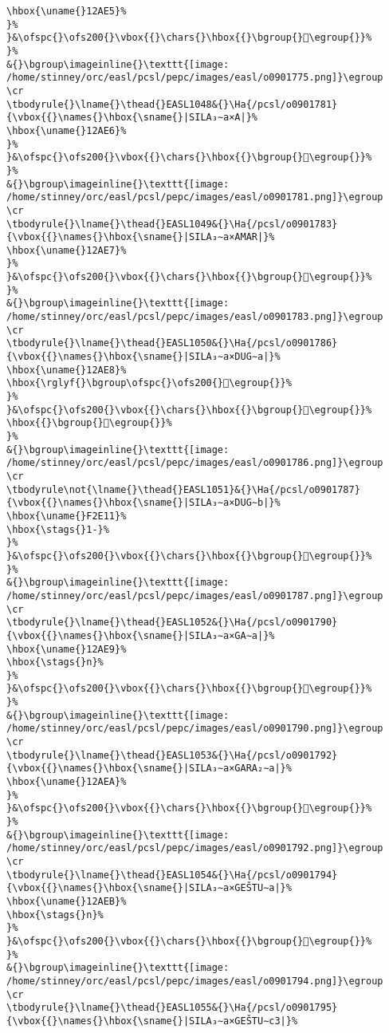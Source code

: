 \begin{verbatim}
\hbox{\uname{}12AE5}%
}%
}&\ofspc{}\ofs200{}\vbox{{}\chars{}\hbox{{}\bgroup{}𒫥\egroup{}}%
}%
&{}\bgroup\imageinline{}\texttt{[image: /home/stinney/orc/easl/pcsl/pepc/images/easl/o0901775.png]}\egroup
\cr
\tbodyrule{}\lname{}\thead{}EASL1048&{}\Ha{/pcsl/o0901781}{\vbox{{}\names{}\hbox{\sname{}|SILA₃∼a×A|}%
\hbox{\uname{}12AE6}%
}%
}&\ofspc{}\ofs200{}\vbox{{}\chars{}\hbox{{}\bgroup{}𒫦\egroup{}}%
}%
&{}\bgroup\imageinline{}\texttt{[image: /home/stinney/orc/easl/pcsl/pepc/images/easl/o0901781.png]}\egroup
\cr
\tbodyrule{}\lname{}\thead{}EASL1049&{}\Ha{/pcsl/o0901783}{\vbox{{}\names{}\hbox{\sname{}|SILA₃∼a×AMAR|}%
\hbox{\uname{}12AE7}%
}%
}&\ofspc{}\ofs200{}\vbox{{}\chars{}\hbox{{}\bgroup{}𒫧\egroup{}}%
}%
&{}\bgroup\imageinline{}\texttt{[image: /home/stinney/orc/easl/pcsl/pepc/images/easl/o0901783.png]}\egroup
\cr
\tbodyrule{}\lname{}\thead{}EASL1050&{}\Ha{/pcsl/o0901786}{\vbox{{}\names{}\hbox{\sname{}|SILA₃∼a×DUG∼a|}%
\hbox{\uname{}12AE8}%
\hbox{\rglyf{}\bgroup\ofspc{}\ofs200{}𒫨\egroup{}}%
}%
}&\ofspc{}\ofs200{}\vbox{{}\chars{}\hbox{{}\bgroup{}𒬉\egroup{}}%
\hbox{{}\bgroup{}𒫨\egroup{}}%
}%
&{}\bgroup\imageinline{}\texttt{[image: /home/stinney/orc/easl/pcsl/pepc/images/easl/o0901786.png]}\egroup
\cr
\tbodyrule\not{\lname{}\thead{}EASL1051}&{}\Ha{/pcsl/o0901787}{\vbox{{}\names{}\hbox{\sname{}|SILA₃∼a×DUG∼b|}%
\hbox{\uname{}F2E11}%
\hbox{\stags{}1-}%
}%
}&\ofspc{}\ofs200{}\vbox{{}\chars{}\hbox{{}\bgroup{}󲸑\egroup{}}%
}%
&{}\bgroup\imageinline{}\texttt{[image: /home/stinney/orc/easl/pcsl/pepc/images/easl/o0901787.png]}\egroup
\cr
\tbodyrule{}\lname{}\thead{}EASL1052&{}\Ha{/pcsl/o0901790}{\vbox{{}\names{}\hbox{\sname{}|SILA₃∼a×GA∼a|}%
\hbox{\uname{}12AE9}%
\hbox{\stags{}n}%
}%
}&\ofspc{}\ofs200{}\vbox{{}\chars{}\hbox{{}\bgroup{}𒫩\egroup{}}%
}%
&{}\bgroup\imageinline{}\texttt{[image: /home/stinney/orc/easl/pcsl/pepc/images/easl/o0901790.png]}\egroup
\cr
\tbodyrule{}\lname{}\thead{}EASL1053&{}\Ha{/pcsl/o0901792}{\vbox{{}\names{}\hbox{\sname{}|SILA₃∼a×GARA₂∼a|}%
\hbox{\uname{}12AEA}%
}%
}&\ofspc{}\ofs200{}\vbox{{}\chars{}\hbox{{}\bgroup{}𒫪\egroup{}}%
}%
&{}\bgroup\imageinline{}\texttt{[image: /home/stinney/orc/easl/pcsl/pepc/images/easl/o0901792.png]}\egroup
\cr
\tbodyrule{}\lname{}\thead{}EASL1054&{}\Ha{/pcsl/o0901794}{\vbox{{}\names{}\hbox{\sname{}|SILA₃∼a×GEŠTU∼a|}%
\hbox{\uname{}12AEB}%
\hbox{\stags{}n}%
}%
}&\ofspc{}\ofs200{}\vbox{{}\chars{}\hbox{{}\bgroup{}𒫫\egroup{}}%
}%
&{}\bgroup\imageinline{}\texttt{[image: /home/stinney/orc/easl/pcsl/pepc/images/easl/o0901794.png]}\egroup
\cr
\tbodyrule{}\lname{}\thead{}EASL1055&{}\Ha{/pcsl/o0901795}{\vbox{{}\names{}\hbox{\sname{}|SILA₃∼a×GEŠTU∼c3|}%

\end{verbatim}
